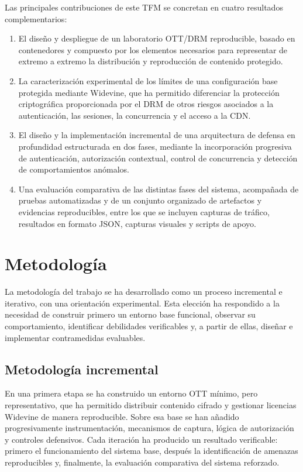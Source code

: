Las principales contribuciones de este TFM se concretan en cuatro resultados complementarios:

\begin{enumerate}
    \item El diseño y despliegue de un laboratorio OTT/DRM reproducible, basado en contenedores y compuesto por los elementos necesarios para representar de extremo a extremo la distribución y reproducción de contenido protegido.
    \item La caracterización experimental de los límites de una configuración base protegida mediante Widevine, que ha permitido diferenciar la protección criptográfica proporcionada por el DRM de otros riesgos asociados a la autenticación, las sesiones, la concurrencia y el acceso a la CDN.
    \item El diseño y la implementación incremental de una arquitectura de defensa en profundidad estructurada en dos fases, mediante la incorporación progresiva de autenticación, autorización contextual, control de concurrencia y detección de comportamientos anómalos.
    \item Una evaluación comparativa de las distintas fases del sistema, acompañada de pruebas automatizadas y de un conjunto organizado de artefactos y evidencias reproducibles, entre los que se incluyen capturas de tráfico, resultados en formato JSON, capturas visuales y scripts de apoyo.
\end{enumerate}

\section{Metodología}

La metodología del trabajo se ha desarrollado como un proceso incremental e iterativo, con una orientación experimental. Esta elección ha respondido a la necesidad de construir primero un entorno base funcional, observar su comportamiento, identificar debilidades verificables y, a partir de ellas, diseñar e implementar contramedidas evaluables.

\subsection{Metodología incremental}

En una primera etapa se ha construido un entorno OTT mínimo, pero representativo, que ha permitido distribuir contenido cifrado y gestionar licencias Widevine de manera reproducible. Sobre esa base se han añadido progresivamente instrumentación, mecanismos de captura, lógica de autorización y controles defensivos. Cada iteración ha producido un resultado verificable: primero el funcionamiento del sistema base, después la identificación de amenazas reproducibles y, finalmente, la evaluación comparativa del sistema reforzado.

